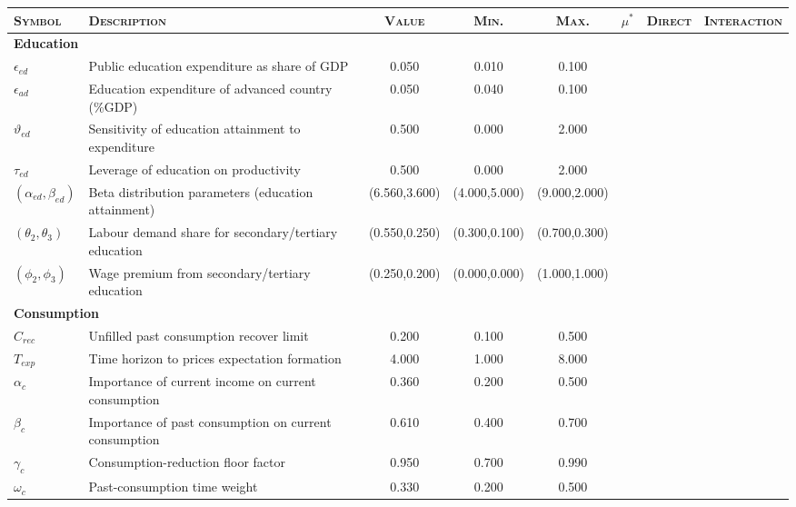 \documentclass[a4paper,11pt]{article}
\begin{document}
\begin{appendices}
\begin{landscape}
\begin{table}[h]
\centering
\footnotesize
\begin{tabular}{llcccccc}
\toprule
\textsc{Symbol} 				& \textsc{Description} 									& \textsc{Value}	& \textsc{Min.}	& \textsc{Max.}	& \textsc{$\mu^*$}	& \textsc{Direct}	& \textsc{Interaction} \\
\midrule
\multicolumn{2}{l}{\textbf{Education}} \\
$\epsilon_{ed}$					& Public education expenditure as share of GDP			& 0.050				& 0.010			& 0.100			&					&					&	 \\
$\epsilon_{ad}$					& Education expenditure of advanced country (\%GDP)		& 0.050				& 0.040			& 0.100			&					&					&	 \\
$\vartheta_{ed}$				& Sensitivity of education attainment to expenditure	& 0.500				& 0.000			& 2.000			&					&					&	 \\
$\tau_{ed}$						& Leverage of education on productivity					& 0.500				& 0.000			& 2.000			&					&					&	 \\
$(\alpha_{ed},\beta_{ed})$		& Beta distribution parameters (education attainment)	& (6.560,3.600)		& (4.000,5.000)	& (9.000,2.000)	&					&					&	 \\
$(\theta_2,\theta_3)$			& Labour demand share for secondary/tertiary education	& (0.550,0.250)		& (0.300,0.100)	& (0.700,0.300)	&					&					&	 \\
$(\phi_2,\phi_3)$				& Wage premium from secondary/tertiary education		& (0.250,0.200)		& (0.000,0.000)	& (1.000,1.000)	&					&					&	 \\
\midrule
\multicolumn{2}{l}{\textbf{Consumption}} \\
$C_{rec}$ 						& Unfilled past consumption recover limit				& 0.200				& 0.100			& 0.500			& 					& 					& 	 \\
$T_{exp}$ 						& Time horizon to prices expectation formation			& 4.000				& 1.000			& 8.000			& 					& 					& 	 \\
$\alpha_c$ 						& Importance of current income on current consumption	& 0.360				& 0.200			& 0.500			& 					& 					& 	 \\
$\beta_c$ 						& Importance of past consumption on current consumption	& 0.610				& 0.400			& 0.700			& 					& 					& 	 \\
$\gamma_c$ 						& Consumption-reduction floor factor					& 0.950				& 0.700			& 0.990			& 					& 					& 	 \\
$\omega_c$ 						& Past-consumption time weight							& 0.330				& 0.200			& 0.500			& 					& 					& 	 \\

\end{tabular}
\end{table}
\end{landscape}
\end{appendices}
\end{document}
